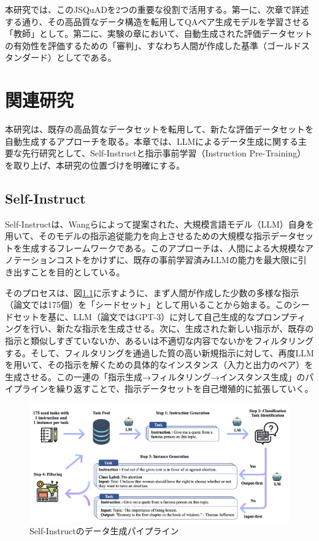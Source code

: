 \documentclass[a4paper,11pt]{jreport}
\begin{document}
本研究では、このJSQuADを2つの重要な役割で活用する。第一に、次章で詳述する通り、その高品質なデータ構造を転用してQAペア生成モデルを学習させる「教師」として。第二に、実験の章において、自動生成された評価データセットの有効性を評価するための「審判」、すなわち人間が作成した基準（ゴールドスタンダード）としてである。





\chapter{関連研究}
\label{chap:related_work}

本研究は、既存の高品質なデータセットを転用して、新たな評価データセットを自動生成するアプローチを取る。本章では、LLMによるデータ生成に関する主要な先行研究として、Self-Instructと指示事前学習（Instruction Pre-Training）を取り上げ、本研究の位置づけを明確にする。

\section{Self-Instruct}

Self-Instructは、Wangらによって提案された\cite{Self-Instruct}、大規模言語モデル（LLM）自身を用いて、そのモデルの指示追従能力を向上させるための大規模な指示データセットを生成するフレームワークである。このアプローチは、人間による大規模なアノテーションコストをかけずに、既存の事前学習済みLLMの能力を最大限に引き出すことを目的としている。

そのプロセスは、図\ref{fig:self_instruct_example}に示すように、まず人間が作成した少数の多様な指示（論文では175個）を「シードセット」として用いることから始まる。このシードセットを基に、LLM（論文ではGPT-3）に対して自己生成的なプロンプティングを行い、新たな指示を生成させる。次に、生成された新しい指示が、既存の指示と類似しすぎていないか、あるいは不適切な内容でないかをフィルタリングする。そして、フィルタリングを通過した質の高い新規指示に対して、再度LLMを用いて、その指示を解くための具体的なインスタンス（入力と出力のペア）を生成させる。この一連の「指示生成→フィルタリング→インスタンス生成」のパイプラインを繰り返すことで、指示データセットを自己増殖的に拡張していく。

\begin{figure}[t]
  \centering
  \includegraphics[width=0.9\linewidth]{./fig/self-instruct_fig1.png}
  \caption{Self-Instructのデータ生成パイプライン\cite{Self-Instruct}}
  \label{fig:self_instruct_example}
\end{figure}
\end{document}
